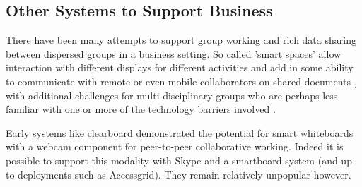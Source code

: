 \subsection{Other Systems to Support Business}                  
There have been many attempts to support group working and rich data sharing between dispersed groups in a business setting. So called 'smart spaces' allow interaction with different displays for different activities and add in some ability to communicate with remote or even mobile collaborators on shared documents \cite{Bardram2012}, with additional challenges for multi-disciplinary groups who are perhaps less familiar with one or more of the technology barriers involved \cite{Adamczyk2007}.\par
Early systems like clearboard \cite{Ishii1993} demonstrated the potential for smart whiteboards with a webcam component for peer-to-peer collaborative working. Indeed it is possible to support this modality with Skype and a smartboard system (and up to deployments such as Accessgrid). They remain relatively unpopular however.\par
